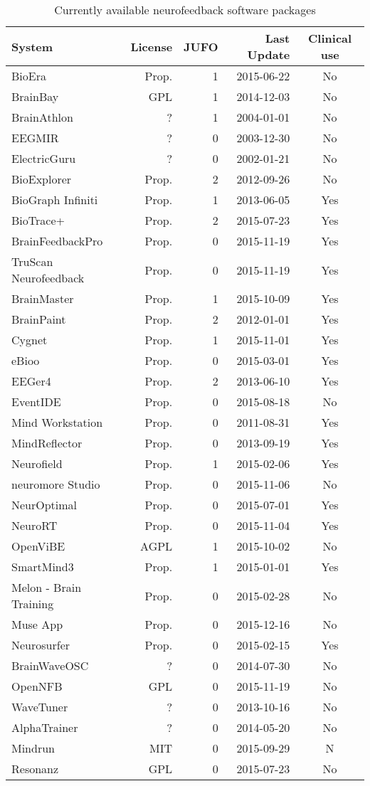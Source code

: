 \begin{table}[ht]
\centering
\begin{tabular}{lrrrc}
System & License & JUFO & Last Update & Clinical use \\       
\hline
BioEra & Prop. & 1 & 2015-06-22 & No \\   
BrainBay & GPL & 1 & 2014-12-03 & No \\   
BrainAthlon & ? & 1 & 2004-01-01 & No \\   
EEGMIR & ? & 0 & 2003-12-30 & No \\   
ElectricGuru & ? & 0 & 2002-01-21 & No \\   
BioExplorer & Prop. & 2 & 2012-09-26 & No \\  
BioGraph Infiniti & Prop. & 1 & 2013-06-05 & Yes \\
BioTrace+ & Prop. & 2 & 2015-07-23 & Yes \\
BrainFeedbackPro & Prop. & 0 & 2015-11-19 & Yes \\
TruScan Neurofeedback & Prop. & 0 & 2015-11-19 & Yes \\
BrainMaster & Prop. & 1 & 2015-10-09 & Yes \\
BrainPaint & Prop. & 2 & 2012-01-01 & Yes \\
Cygnet & Prop. & 1 & 2015-11-01 & Yes \\
eBioo & Prop. & 0 & 2015-03-01 & Yes \\
EEGer4 & Prop. & 2 & 2013-06-10 & Yes \\
EventIDE & Prop. & 0 & 2015-08-18 & No \\
Mind Workstation & Prop. & 0 & 2011-08-31 & Yes \\
MindReflector & Prop. & 0 & 2013-09-19 & Yes \\
Neurofield & Prop. & 1 & 2015-02-06 & Yes \\
neuromore Studio & Prop. & 0 & 2015-11-06 & No \\
NeurOptimal & Prop. & 0 & 2015-07-01 & Yes \\
NeuroRT & Prop. & 0 & 2015-11-04 & Yes \\
OpenViBE & AGPL & 1 & 2015-10-02 & No \\
SmartMind3 & Prop. & 1 & 2015-01-01 & Yes \\
Melon - Brain Training & Prop. & 0 & 2015-02-28 & No \\
Muse App & Prop. & 0 & 2015-12-16 & No \\
Neurosurfer & Prop. & 0 & 2015-02-15 & Yes \\
BrainWaveOSC & ? & 0 & 2014-07-30 & No \\
OpenNFB & GPL & 0 & 2015-11-19 & No \\
WaveTuner & ? & 0 & 2013-10-16 & No \\
AlphaTrainer & ? & 0 & 2014-05-20 & No \\
Mindrun & MIT & 0 & 2015-09-29 & N\\
Resonanz & GPL & 0 & 2015-07-23 & No \\
\end{tabular}
    \caption{Currently available neurofeedback software packages}\label{nfbsoftware}
\end{table}

